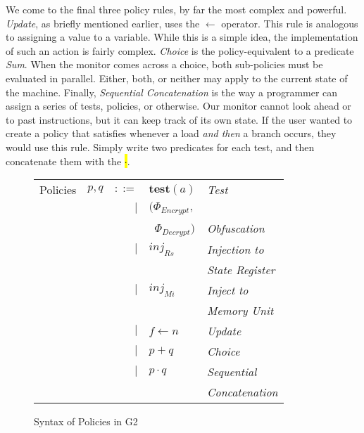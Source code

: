 \documentclass[sigconf,usenames,dvipsnames,svgnames,table]{acmart}
\newcommand{\shdtt}[1]{\sethlcolor{MyLightGrey}\texttt{\hl{#1}}}
\def \sysname {\textsc{G2}\xspace}
\begin{document}
        We come to the final three policy rules, by far the most complex and powerful.
        \textit{Update}, as briefly mentioned earlier, uses the $\leftarrow$ operator.
        This rule is analogous to assigning a value to a variable.
        While this is a simple idea, the implementation of such an action is fairly complex.
        \textit{Choice} is the policy-equivalent to a predicate \textit{Sum}.
        When the monitor comes across a choice, both sub-policies must be evaluated in parallel.
        Either, both, or neither may apply to the current state of the machine.
        Finally, \textit{Sequential Concatenation} is the way a programmer can assign a series of tests, policies, or otherwise.
        Our monitor cannot look ahead or to past instructions, but it can keep track of its own state.
        If the user wanted to create a policy that satisfies whenever a load \textit{and then} a branch occurs, they would use this rule.
        Simply write two predicates for each test, and then concatenate them with the \shdtt{$\cdot$}.

        \begin{figure}
          \centering
          \begin{tabular}{l c r l l}
            Policies  & $p,q$ & $::=$  & $\mathbf{test}(a)$ & \textit{Test}           \\
                      &       & $\mid$ & $(\Phi_{Encrypt},$ &                         \\
                      &       &        &\ $\Phi_{Decrypt})$ & \textit{Obfuscation}    \\
                      &       & $\mid$ & $inj_{Rs}$         & \textit{Injection to}   \\
                      &       &        &                    & \textit{State Register} \\
                      &       & $\mid$ & $inj_{Mi}$         & \textit{Inject to}      \\
                      &       &        &                    & \textit{Memory Unit}    \\
                      &       & $\mid$ & $f \leftarrow n$   & \textit{Update}         \\
                      &       & $\mid$ & $p + q$            & \textit{Choice}         \\
                      &       & $\mid$ & $p \cdot q$        & \textit{Sequential}     \\
                      &       &        &                    & \textit{Concatenation}  \\
          \end{tabular}
          \caption{Syntax of Policies in \sysname}
          \label{fig:spec:synt:pol}
        \end{figure}
\end{document}

